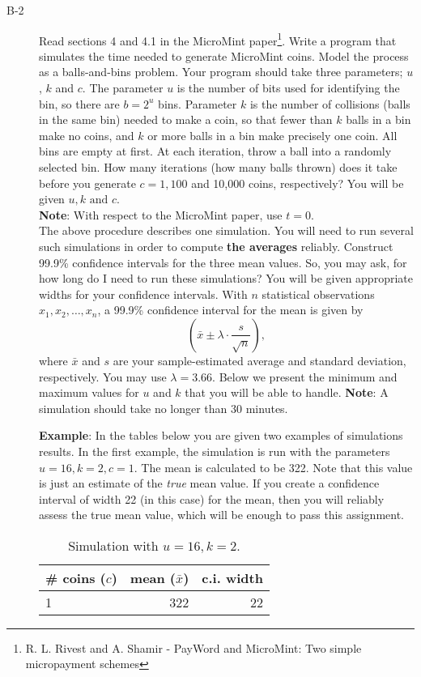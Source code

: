 \documentclass{article}
\begin{document}
\begin{description}
		\item[B-2]{Read sections 4 and 4.1 in the MicroMint paper\footnote{R. L. Rivest and A. Shamir - PayWord and MicroMint: Two simple micropayment schemes}.
			Write a program that simulates the time needed to generate MicroMint coins.
			Model the process as a balls-and-bins problem.
			Your program should take three parameters; $u$, $k$ and $c$.
			The parameter $u$ is the number of bits used for identifying the bin, so there are $b=2^u$ bins.
			Parameter $k$ is the number of collisions (balls in the same bin) needed to make a coin, so that fewer than $k$ balls in a bin make no coins, 
			and $k$ or more balls in a bin make precisely one coin.
			All bins are empty at first.
			At each iteration, throw a ball into a randomly selected bin.
			How many iterations (how many balls thrown) does it take before you generate $c = 1, 100$ and 10,000 coins, respectively?
			You will be given $u, k \textrm{ and } c$.\\
			\textbf{Note}: With respect to the MicroMint paper, use $t=0$.\\
			The above procedure describes one simulation.
			You will need to run several such simulations in order to compute \textbf{the averages} reliably.
			Construct 99.9\% confidence intervals for the three mean values.
			So, you may ask, for how long do I need to run these simulations?
			You will be given appropriate widths for your confidence intervals.
			With $n$ statistical observations $x_1, x_2,\ldots, x_n$, a 99.9\% confidence interval for the mean is given by
			\[\left(\bar{x}\pm\lambda\cdot\frac{s}{\sqrt{n}}\right),\]
			where $\bar{x}$ and $s$ are your sample-estimated average and standard deviation, respectively.
			You may use $\lambda=3.66$.
			Below we present the minimum and maximum values for $u$ and $k$
			that you will be able to handle. \textbf{Note}: A simulation should take no longer than 30 minutes.
			
			\textbf{Example}: In the tables below you are given two examples of simulations results. 
			In the first example,
			the simulation is run with the parameters $u = 16, k = 2, c = 1$. The mean is calculated to be 322.
			Note that this value is just an estimate of the \textit{true} mean value. 
			If you create a confidence interval of width 22 (in this case) for the mean, 
			then you will reliably assess the true mean value, which will be enough to pass this assignment.
			
			\begin{table}[h]
				\centering
				\caption{Simulation with $u = 16, k = 2$.}
				\begin{tabular}{lrr}
					\toprule
					\# coins ($c$) & mean ($\bar{x}$) & c.i. width \\
					\midrule
					1      &        322 &       22 \\
					

\end{tabular}
\end{table}}
\end{description}
\end{document}
